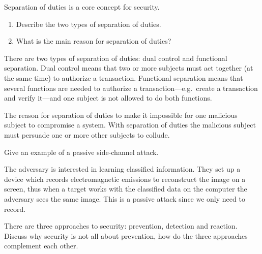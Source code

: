 \begin{frame}
  \begin{exercise}
    Separation of duties is a core concept for security.
    \begin{enumerate}
      \item Describe the two types of separation of duties.
      \item What is the main reason for separation of duties?
    \end{enumerate}
  \end{exercise}
\end{frame}

\begin{frame}
  \begin{solution}
    There are two types of separation of duties:
    dual control and functional separation.
    Dual control means that two or more subjects must act together (at the same 
    time) to authorize a transaction.
    Functional separation means that several functions are needed to authorize 
    a transaction---e.g.~create a transaction and verify it---and one subject 
    is not allowed to do both functions.

    The reason for separation of duties to make it impossible for one malicious 
    subject to compromise a system.
    With separation of duties the malicious subject must persuade one or more 
    other subjects to collude.
  \end{solution}
\end{frame}

  
\begin{frame}
  \begin{exercise}
    Give an example of a passive side-channel attack.
  \end{exercise}
\end{frame}

\begin{frame}
  \begin{solution}
    The adversary is interested in learning classified information.
    They set up a device which records electromagnetic emissions to reconstruct 
    the image on a screen, thus when a target works with the classified data on 
    the computer the adversary sees the same image.
    This is a passive attack since we only need to record.
  \end{solution}
\end{frame}


\begin{frame}
  \begin{exercise}
    There are three approaches to security: prevention, detection and reaction.
    Discuss why security is not all about prevention, how do the three approaches 
    complement each other.
  \end{exercise}
\end{frame}

